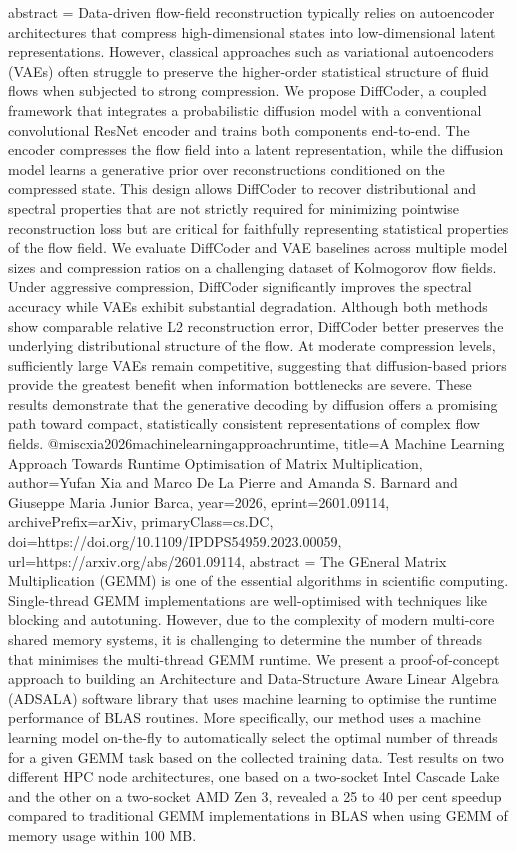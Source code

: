 {      abstract = {Data-driven flow-field reconstruction typically relies on autoencoder architectures that compress high-dimensional states into low-dimensional latent representations. However, classical approaches such as variational autoencoders (VAEs) often struggle to preserve the higher-order statistical structure of fluid flows when subjected to strong compression. We propose DiffCoder, a coupled framework that integrates a probabilistic diffusion model with a conventional convolutional ResNet encoder and trains both components end-to-end. The encoder compresses the flow field into a latent representation, while the diffusion model learns a generative prior over reconstructions conditioned on the compressed state. This design allows DiffCoder to recover distributional and spectral properties that are not strictly required for minimizing pointwise reconstruction loss but are critical for faithfully representing statistical properties of the flow field. We evaluate DiffCoder and VAE baselines across multiple model sizes and compression ratios on a challenging dataset of Kolmogorov flow fields. Under aggressive compression, DiffCoder significantly improves the spectral accuracy while VAEs exhibit substantial degradation. Although both methods show comparable relative L2 reconstruction error, DiffCoder better preserves the underlying distributional structure of the flow. At moderate compression levels, sufficiently large VAEs remain competitive, suggesting that diffusion-based priors provide the greatest benefit when information bottlenecks are severe. These results demonstrate that the generative decoding by diffusion offers a promising path toward compact, statistically consistent representations of complex flow fields.}
}@misc{xia2026machinelearningapproachruntime,
      title={A Machine Learning Approach Towards Runtime Optimisation of Matrix Multiplication}, 
      author={Yufan Xia and Marco De La Pierre and Amanda S. Barnard and Giuseppe Maria Junior Barca},
      year={2026},
      eprint={2601.09114},
      archivePrefix={arXiv},
      primaryClass={cs.DC},
      doi={https://doi.org/10.1109/IPDPS54959.2023.00059},
      url={https://arxiv.org/abs/2601.09114},
      abstract = {The GEneral Matrix Multiplication (GEMM) is one of the essential algorithms in scientific computing. Single-thread GEMM implementations are well-optimised with techniques like blocking and autotuning. However, due to the complexity of modern multi-core shared memory systems, it is challenging to determine the number of threads that minimises the multi-thread GEMM runtime. We present a proof-of-concept approach to building an Architecture and Data-Structure Aware Linear Algebra (ADSALA) software library that uses machine learning to optimise the runtime performance of BLAS routines. More specifically, our method uses a machine learning model on-the-fly to automatically select the optimal number of threads for a given GEMM task based on the collected training data. Test results on two different HPC node architectures, one based on a two-socket Intel Cascade Lake and the other on a two-socket AMD Zen 3, revealed a 25 to 40 per cent speedup compared to traditional GEMM implementations in BLAS when using GEMM of memory usage within 100 MB.}
}

